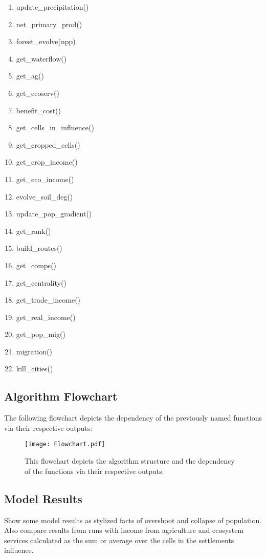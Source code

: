 \begin{enumerate}
\begin{enumerate}
			\item update_precipitation()
			\item net_primary_prod()
			\item forest_evolve(npp)
			\item get_waterflow()
			\item get_ag()
			\item get_ecoserv()
			\item benefit_cost()
			\item get_cells_in_influence()
			\item get_cropped_cells()
			\item get_crop_income()
			\item get_eco_income()
			\item evolve_soil_deg()
			\item update_pop_gradient()
			\item get_rank()
			\item build_routes()
			\item get_comps()
			\item get_centrality()
			\item get_trade_income()
			\item get_real_income()
			\item get_pop_mig()
			\item migration()
			\item kill_cities()
		\end{enumerate}
\end{enumerate}
\subsection{Algorithm Flowchart}
The following flowchart depicts the dependency of the previously named functions via their respective outputs:
\begin{figure}[H]
	\centering
	\texttt{[image: Flowchart.pdf]}
	\caption{This flowchart depicts the algorithm structure and the dependency of the functions via their respective outputs.}
	\label{fig:flowchart}
\end{figure}
\subsection{Model Results}
Show some model results as stylized facts of overshoot and collapse of
population. \\
Also compare results from runs with income from agriculture and ecosystem
services calculated as the sum or average over the cells in the settlements
influence.
